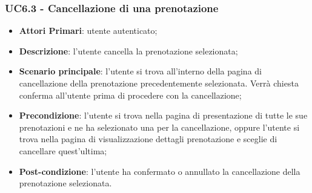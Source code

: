 \subsubsection{UC6.3 - Cancellazione di una prenotazione}
\begin{itemize}
	\item \textbf{Attori Primari}: utente autenticato;
	\item \textbf{Descrizione}: l'utente cancella la prenotazione selezionata;
	\item \textbf{Scenario principale}: l'utente si trova all'interno della pagina di cancellazione della prenotazione precedentemente selezionata. Verrà chiesta conferma all'utente prima di procedere con la cancellazione;
	\item \textbf{Precondizione}: l'utente si trova nella pagina di presentazione di tutte le sue prenotazioni e ne ha selezionato una per la cancellazione, oppure l'utente si trova nella pagina di visualizzazione dettagli prenotazione e sceglie di cancellare quest'ultima;
	\item \textbf{Post-condizione}: l'utente ha confermato o annullato la cancellazione della prenotazione selezionata.
\end{itemize}
